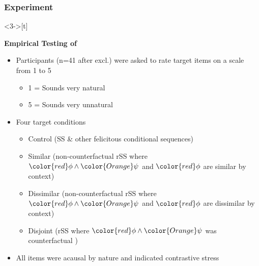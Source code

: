 \subsubsection{Experiment}
\begin{frame}<3->[t]
\subsectionpage
	
	\textbf{Empirical Testing of \citet{Lewis2017}}\vskip 9pt
    \begin{itemize}
        \item<3-> Participants (n=41 after excl.) were asked to rate target items on a scale from 1 to 5\vskip 9pt
            \begin{itemize}
                \item<4-> 1 = Sounds very natural
                \item<4-> 5 = Sounds very unnatural
            \end{itemize}\vskip 9pt
        \item<5-> Four target conditions
            \begin{itemize}
                \item<6-> Control (SS \& other felicitous conditional sequences)
                \item<7-> Similar (non-counterfactual rSS where ${\color{red}\phi}\land{\color{Orange}\psi}$ and $\color{red}\phi$ are similar by context)
                \item<7-> Dissimilar (non-counterfactual rSS where ${\color{red}\phi}\land{\color{Orange}\psi}$ and $\color{red}\phi$ are dissimilar by context)
                \item<8-> Disjoint (rSS where ${\color{red}\phi}\land{\color{Orange}\psi}$ was counterfactual%
                )
            \end{itemize}\vskip 9pt
        \item<9-> All items were acausal by nature and indicated contrastive stress
    \end{itemize}
\end{frame}

